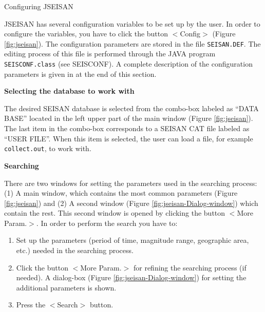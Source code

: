 Configuring JSEISAN 

JSEISAN has several configuration variables to be set up by the user. In order to configure the variables, you have to click the button $<$Config$>$ (Figure \ref{fig:jseisan}). The configuration parameters are stored in the file \texttt{SEISAN.DEF}. The editing process of this file is performed through the JAVA program \texttt{SEISCONF.class} (see SEISCONF). A complete description of the configuration parameters is given in at the end of this section. 



\textbf{Selecting the database to work with}

The desired SEISAN database is selected from the combo-box labeled as ``DATA BASE'' located in the left upper part of the main window (Figure \ref{fig:jseisan}). The last item in the combo-box corresponds to a SEISAN CAT file labeled as ``USER FILE''. When this item is selected, the user can load a file, for example \texttt{collect.out}, to work with. 

\textbf{Searching}

There are two windows for setting the parameters used in the searching process: (1) A main window, which contains the most common parameters (Figure \ref{fig:jseisan}) and 
(2) 
A second window (Figure \ref{fig:jseisan-Dialog-window}) which contain the rest. This second window is opened by clicking the button $<$More Param.$>$. In order to perform the search you have to: 

\begin{enumerate}
\item Set up the parameters (period of time, magnitude range, geographic area, etc.) needed in the searching process. 
\item Click the button $<$More Param.$>$ for refining the searching process (if needed). A dialog-box (Figure \ref{fig:jseisan-Dialog-window}) for setting the additional parameters is shown. 
\item Press the $<$Search$>$ button. 
\end{enumerate}


